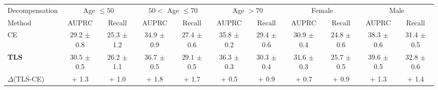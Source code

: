 \documentclass[nohyperref]{article}
\begin{document}
\begin{table}[h]
{{\begin{tabular}{lcccccccccc}
\toprule
 Decompensation & \multicolumn{2}{c}{Age $\leq 50$} & \multicolumn{2}{c}{$50 <$ Age $\leq 70$} & \multicolumn{2}{c}{Age $> 70$ } & \multicolumn{2}{c}{Female} & \multicolumn{2}{c}{Male}\\
 \cmidrule(lr){2-3} \cmidrule(lr){4-5}\cmidrule(lr){6-7}\cmidrule(lr){8-9}\cmidrule(lr){10-11}
Method &         AUPRC &   Recall &         AUPRC &   Recall &         AUPRC &   Recall & AUPRC &   Recall & AUPRC &   Recall\\
\midrule
CE     &              29.2 $\pm$ 0.8 &             25.3 $\pm$ 1.2 &             34.9 $\pm$ 0.9 &             27.4 $\pm$ 0.6 &             35.8 $\pm$ 0.2 &             29.4 $\pm$ 0.6 &             30.9 $\pm$ 0.4 &             24.8 $\pm$ 0.6 &             38.3 $\pm$ 0.6 &             31.4 $\pm$ 0.5 \\
\textbf{TLS}     &  $\mathbf{30.5}$ $\pm$ 0.5 &             26.2 $\pm$ 1.1 &  $\mathbf{36.7}$ $\pm$ 0.5 &  $\mathbf{29.1}$ $\pm$ 0.5 &  $\mathbf{36.3}$ $\pm$ 0.3 &  $\mathbf{30.3}$ $\pm$ 0.4 &  $\mathbf{31.6}$ $\pm$ 0.3 &  $\mathbf{25.7}$ $\pm$ 0.5 &  $\mathbf{39.6}$ $\pm$ 0.5 &  $\mathbf{32.8}$ $\pm$ 0.6 \\
$\Delta$(TLS-CE)    &  {\color{Green}+ 1.3} &  {\color{Green}+ 1.0} &  {\color{Green}+ 1.8} &  {\color{Green}+ 1.7} &  {\color{Green}+ 0.5} &  {\color{Green}+ 0.9} &  {\color{Green}+ 0.7} &  {\color{Green}+ 0.9} &  {\color{Green}+ 1.3} &  {\color{Green}+ 1.4} \\
\bottomrule
\end{tabular}}}
\end{table}
\end{document}
